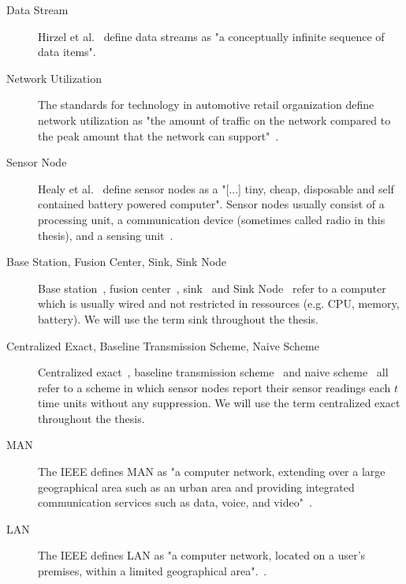 \begin{description}

    \item[Data Stream]
        Hirzel et al.~\cite{hirzel2014catalog} define data streams as "a
        conceptually infinite sequence of data items".

    \item[Network Utilization]
        The standards for technology in automotive retail organization define
        network utilization as "the amount of traffic on the network compared
        to the peak amount that the network can support"~\cite{networkutil}.

    \item[Sensor Node]
        Healy et al.~\cite{healy2008wireless} define sensor nodes as a "[...]
        tiny, cheap, disposable and self contained battery powered computer".
        Sensor nodes usually consist of a processing unit, a communication
        device (sometimes called radio in this thesis), and a sensing
        unit~\cite{akyildiz2002wireless}.

        

    \item[Base Station, Fusion Center, Sink, Sink Node]
        Base station~\cite{padhy2006utility}, fusion
        center~\cite{willett2004backcasting}, sink~\cite{alippi2009energy} and
        Sink Node~\cite{chen2013sink} refer to a computer which is usually
        wired and not restricted in ressources (e.g. CPU, memory, battery).
        We will use the term sink throughout the thesis.

    \item[Centralized Exact, Baseline Transmission Scheme, Naive Scheme]
        Centralized exact~\cite{gedik2007asap}, baseline transmission
        scheme~\cite{luo2009compressive} and naive
        scheme~\cite{cheng2010efficient} all refer to a scheme in which sensor
        nodes report their sensor readings each $ t $ time units without any
        suppression. We will use the term centralized exact throughout the
        thesis.

    \item[\ac{MAN}]
        The \ac{IEEE} defines \ac{MAN} as "a computer network, extending over a
        large geographical area such as an urban area and providing integrated
        communication services such as data, voice, and video"~\cite{ieee802}.

    \item[\ac{LAN}]
        The \ac{IEEE} defines \ac{LAN} as "a computer network, located on a
        user’s premises, within a limited geographical area".~\cite{ieee802}.


\end{description}
